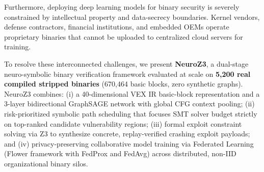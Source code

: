 \documentclass[10pt,conference]{IEEEtran}
\begin{document}
Furthermore, deploying deep learning models for binary security is severely constrained by intellectual property and data-secrecy
boundaries. Kernel vendors, defense contractors, financial institutions, and embedded OEMs operate proprietary binaries that cannot be
uploaded to centralized cloud servers for training.

To resolve these interconnected challenges, we present \textbf{NeuroZ3}, a dual-stage neuro-symbolic binary verification framework
evaluated at scale on \textbf{5{,}200 real compiled stripped binaries} (670{,}464 basic blocks, zero synthetic graphs). NeuroZ3 combines:
(i) a 40-dimensional VEX IR basic-block representation and a 3-layer bidirectional GraphSAGE network with global CFG context pooling;
(ii) risk-prioritized symbolic path scheduling that focuses SMT solver budget strictly on top-ranked candidate vulnerability regions;
(iii) formal exploit constraint solving via Z3 to synthesize concrete, replay-verified crashing exploit payloads; and
(iv) privacy-preserving collaborative model training via Federated Learning (Flower framework with FedProx and FedAvg) across
distributed, non-IID organizational binary silos.
\end{document}
